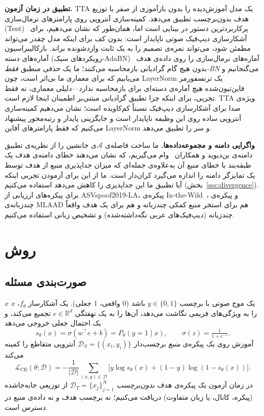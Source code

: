 \documentclass[a4paper,11pt]{article}
\begin{document}
\textbf{تطبیق در زمان آزمون.} TTA یک مدل آموزش‌دیده را بدون بازآموزی از صفر
با توزیع هدف بدون‌برچسب تطبیق می‌دهد. کمینه‌سازی آنتروپی روی پارامترهای
نرمال‌سازی (Tent)~\cite{tent} پرکاربردترین دستور در بینایی است اما،
همان‌طور که نشان می‌دهیم، برای آشکارسازی دیپ‌فیک صوتی ناپایدار است: بدون
کف برای اینکه مدل چقدر می‌تواند مطمئن شود، می‌تواند نمره‌ی تصمیم را به یک
ثابت واردشونده براند. بازکالیبراسیون آماره‌های دسته (رویکردهای
سبک-AdaBN)~\cite{adabn} آماره‌های نرمال‌سازی را روی داده‌ی هدف بدون هیچ
گام گرادیانی بازمحاسبه می‌کنند؛ ما یک حذفی منطبق \emph{فقط-BN} می‌گنجانیم و
می‌یابیم که برای معماری ما بی‌اثر است، چون LayerNorm یک ترنسفورمر
فاین‌تیون‌شده هیچ آماره‌ی دسته‌ای برای بازمحاسبه ندارد---دلیلی معماری، نه
فقط تجربی، برای اینکه چرا تطبیق گرادیانی مبتنی‌بر اطمینان اینجا لازم است.
TTA ویژه‌ی صدا برای آشکارسازی دیپ‌فیک نسبتاً کم‌کاویده است؛ نشان می‌دهیم
کمینه‌سازی آنتروپی ساده روی این وظیفه ناپایدار است و جایگزینی پایدار و
رتبه‌محور پیشنهاد می‌کنیم که فقط پارامترهای آفاین LayerNorm و سر را تطبیق
می‌دهد.

\textbf{واگرایی دامنه و مجموعه‌داده‌ها.} ما ساخت فاصله‌ی $\mathcal{A}$ی
جانشین را از نظریه‌ی تطبیق دامنه‌ی بن‌دیوید و همکاران~\cite{bendavid}
وام می‌گیریم، که نشان می‌دهند خطای دامنه‌ی هدف یک طبقه‌بند با خطای منبع آن
به‌علاوه‌ی جمله‌ای که میزان جداپذیری منبع از هدف توسط یک تمایزگر دامنه را
اندازه می‌گیرد کران‌دار است. ما از این برای آزمودن تجربی اینکه آیا تطبیق ما
این جداپذیری را کاهش می‌دهد استفاده می‌کنیم (بخش~\ref{sec:divergence}). برای
پیکره‌های ارزیابی از ASVspoof2019-LA، پیکره‌ی In-the-Wild~\cite{itw}، و
پیکره‌ی چندزبانه‌ی MLAAD هم برای استخر منبع کمکی چندزبانه و هم برای یک هدف
واقعاً چندزبانه (دیپ‌فیک‌های عربی نگه‌داشته‌شده) و تشخیص زبانی استفاده
می‌کنیم.

\section{روش}
\subsection{صورت‌بندی مسئله}
$x$ یک موج صوتی با برچسب $y\in\{0,1\}$ باشد ($0$ واقعی، $1$ جعلی). یک
آشکارساز $f_\theta$، $x$ را به ویژگی‌های فریمی نگاشت می‌دهد، آن‌ها را به
یک نهفتگی $e\in\mathbb{R}^{d}$ تجمیع می‌کند، و یک احتمال جعلی خروجی
می‌دهد
\begin{equation}
s_\theta(x)=\sigma\!\left(w^\top e+b\right)=P_\theta(y{=}1\mid x),\qquad \sigma(z)=\tfrac{1}{1+e^{-z}} .
\end{equation}
آموزش روی یک پیکره‌ی \emph{منبع} برچسب‌دار $\mathcal{D}_S=\{(x_i,y_i)\}$
آنتروپی متقاطع را کمینه می‌کند
\begin{equation}
\mathcal{L}_{\mathrm{CE}}(\theta;\mathcal{D})=-\frac{1}{|\mathcal{D}|}\!\!\sum_{(x,y)\in\mathcal{D}}\!\!
\big[y\log s_\theta(x)+(1{-}y)\log(1{-}s_\theta(x))\big].
\end{equation}
در زمان آزمون یک پیکره‌ی هدف \emph{بدون‌برچسب}
$\mathcal{D}_T=\{x_j\}_{j=1}^{N}$ از توزیعی جابه‌جاشده (پیکره، کانال، یا
زبان متفاوت) دریافت می‌کنیم؛ نه برچسب هدف و نه داده‌ی منبع در دسترس است.
\end{document}
